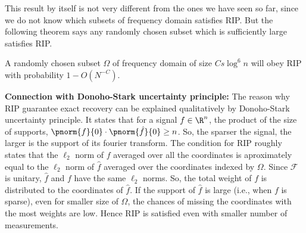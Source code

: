 	This result by itself is not very different from
	the ones we have seen so far, since we do not know which
	subsets of frequency domain satisfies RIP. But the following
	theorem says any randomly chosen subset which is sufficiently
	large satisfies RIP.
	
	\begin{theorem}
		A randomly chosen subset $\Omega$ of frequency domain
		of size $Cs\log^6 n$ will obey RIP with probability
		$1-O(N^{-C})$.
	\end{theorem}

	\noindent
	\textbf{Connection with Donoho-Stark uncertainty principle:} The
	reason why RIP guarantee
	exact recovery can be explained qualitatively by 
	Donoho-Stark uncertainty principle. It states that for a signal
	$f\in \R^n$, the product of the size of  supports, $\pnorm{f}{0}
	\cdot\pnorm{\hat{f}}{0}\geq n$. So, the sparser the signal,
	the larger is the support of its fourier transform.
	The condition for RIP roughly states that the
	$\ell_2$ norm of $f$ averaged over all the coordinates is
	aproximately equal to the $\ell_2$ norm of $\hat{f}$ averaged
	over the coordinates indexed by $\Omega$. Since $\mathcal{F}$
	is unitary, $\hat{f}$ and $f$ have the same $\ell_2$ norms.
	So, the total weight of $f$ is distributed
	to the coordinates of $\hat{f}$.
	If the support of $\hat{f}$ is large (i.e., when $f$ is sparse),
	even for smaller
	size of $\Omega$, the chances of missing the coordinates with
	the most weights are low. Hence RIP is satisfied even with
	smaller number of measurements.
	\indent
